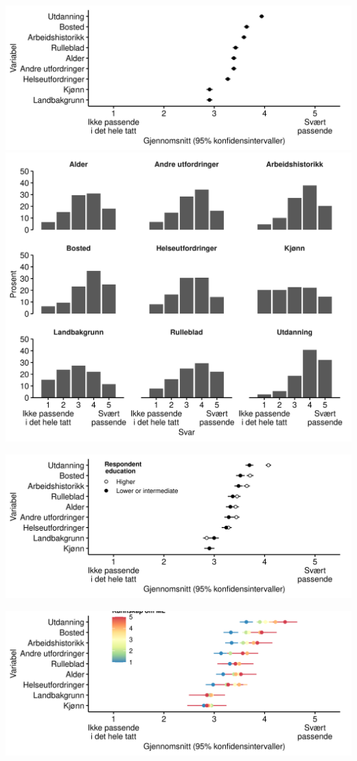 \documentclass[
]{book}
\begin{document}
\includegraphics{figs/png/fig_vars_avg.png}
\includegraphics{figs/png/fig_vars_hist.png}

\includegraphics{figs/png/fig_vars_avg_utd.png}

\includegraphics{figs/png/fig_vars_avg_ml_know.png}
\end{document}
